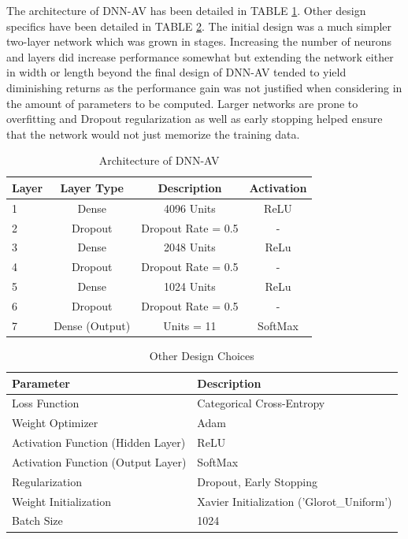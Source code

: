 \documentclass[journal,onecolumn]{IEEEtran}
\begin{document}
The architecture of DNN-AV has been detailed in TABLE \ref{tab:dnn-arch}. Other design specifics have been detailed in TABLE \ref{tab:dnnDesPar}. The initial design was a much simpler two-layer network which was grown in stages. Increasing the number of neurons and layers did increase performance somewhat but extending the network either in width or length beyond the final design of DNN-AV tended to yield diminishing returns as the performance gain was not justified when considering in the amount of parameters to be computed. Larger networks are prone to overfitting and Dropout regularization as well as early stopping helped ensure that the network would not just memorize the training data.

\begin{table}[]
\centering
\caption{Architecture of DNN-AV}
\label{tab:dnn-arch}
\begin{tabular}{lccc}
\hline
Layer & Layer Type & Description        & Activation \\ \hline
1     & Dense      & 4096 Units         & ReLU       \\
2     & Dropout    & Dropout Rate = 0.5 & -          \\
3     & Dense      & 2048 Units         & ReLu       \\
4     & Dropout    & Dropout Rate = 0.5 & -          \\
5     & Dense      & 1024 Units         & ReLu       \\
6     & Dropout    & Dropout Rate = 0.5 & -          \\
7     & Dense (Output)      & Units = 11         & SoftMax    \\ \hline
\end{tabular}
\end{table}

\begin{table}[]
\centering
\caption{Other Design Choices}
\label{tab:dnnDesPar}
\begin{tabular}{@{}ll@{}}
\toprule
Parameter                          & Description                               \\ \midrule
Loss Function                      & Categorical Cross-Entropy                 \\
Weight Optimizer                   & Adam                                      \\
Activation Function (Hidden Layer) & ReLU                                      \\
Activation Function (Output Layer) & SoftMax                                   \\
Regularization                     & Dropout, Early Stopping                   \\
Weight Initialization              & Xavier Initialization ('Glorot\_Uniform') \\
Batch Size                         & 1024                                      \\ \bottomrule
\end{tabular}
\end{table}
\end{document}
